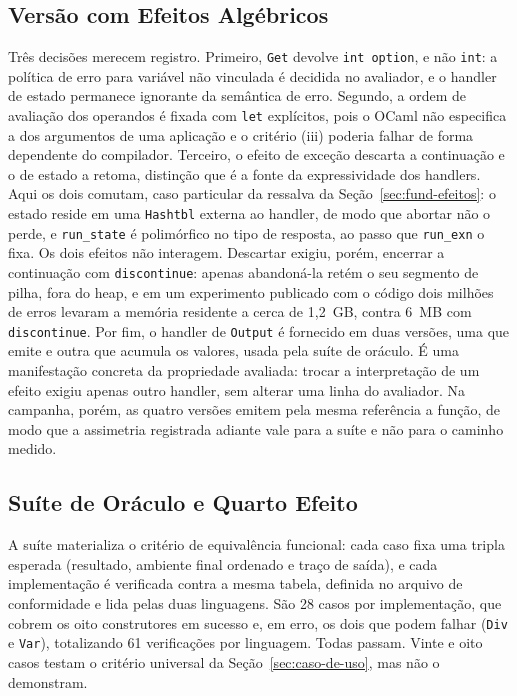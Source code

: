 \documentclass[12pt]{article}
\begin{document}
\subsection{Versão com Efeitos Algébricos}\label{sec:impl-efeitos}

Três decisões merecem registro. Primeiro, \texttt{Get} devolve \texttt{int
option}, e não \texttt{int}: a política de erro para variável não vinculada é
decidida no avaliador, e o handler de estado permanece ignorante da
semântica de erro. Segundo, a ordem
de avaliação dos operandos é fixada com \texttt{let} explícitos, pois o OCaml
não especifica a dos argumentos de uma aplicação e o critério (iii) poderia
falhar de forma dependente do compilador. Terceiro, o efeito de exceção
descarta a continuação e o de estado a retoma, distinção que é a fonte da
expressividade dos handlers. Aqui os dois comutam, caso particular da
ressalva da Seção~\ref{sec:fund-efeitos}: o estado reside em uma
\texttt{Hashtbl} externa ao handler, de modo que abortar não o perde,
e \texttt{run\_state} é polimórfico no tipo de resposta, ao passo que
\texttt{run\_exn} o fixa. Os dois efeitos não interagem. Descartar exigiu,
porém, encerrar a continuação com \texttt{discontinue}: apenas abandoná-la
retém o seu segmento de pilha, fora do heap, e em um experimento
publicado com o código dois milhões de erros levaram a memória residente a
cerca de 1,2~GB, contra 6~MB com \texttt{discontinue}. Por fim, o handler de
\texttt{Output} é fornecido em duas versões, uma que emite e outra que acumula
os valores, usada pela suíte de oráculo. É uma manifestação concreta da
propriedade avaliada: trocar a interpretação de um efeito exigiu apenas outro
handler, sem alterar uma linha do avaliador. Na campanha, porém, as
quatro versões emitem pela mesma referência a função, de modo que a assimetria
registrada adiante vale para a suíte e não para o caminho medido.

\subsection{Suíte de Oráculo e Quarto Efeito}\label{sec:oraculo}

A suíte materializa o critério de equivalência funcional: cada caso fixa uma
tripla esperada (resultado, ambiente final ordenado e traço de saída), e
cada implementação é verificada contra a mesma tabela, definida no arquivo de
conformidade e lida pelas duas linguagens. São 28 casos por implementação, que
cobrem os oito construtores em sucesso e, em erro, os dois que podem falhar
(\texttt{Div} e \texttt{Var}), totalizando 61 verificações por linguagem.
Todas passam. Vinte e oito casos testam o critério universal da
Seção~\ref{sec:caso-de-uso}, mas não o demonstram.
\end{document}
